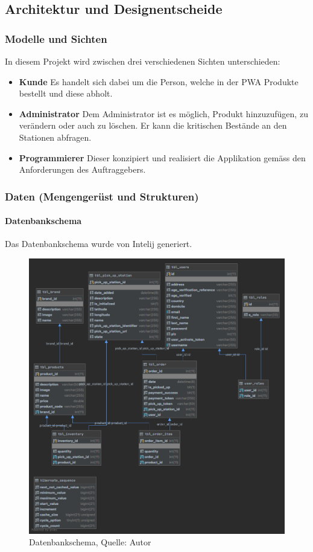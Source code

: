 \subsection{Architektur und Designentscheide}
\subsubsection{Modelle und Sichten}
In diesem Projekt wird zwischen drei verschiedenen Sichten unterschieden:
\begin{itemize}
    \item \textbf{Kunde} Es handelt sich dabei um die Person, welche in der \ac{PWA} Produkte bestellt und diese abholt. 
    \item \textbf{Administrator} Dem Administrator ist es möglich, Produkt hinzuzufügen, zu verändern oder auch zu löschen. Er kann die kritischen Bestände an den Stationen abfragen. 
    \item \textbf{Programmierer} Dieser konzipiert und realisiert die Applikation gemäss den Anforderungen des Auftraggebers.
\end{itemize}
\newpage
\subsubsection{Daten (Mengengerüst und Strukturen)}
\paragraph{Datenbankschema}
Das Datenbankschema wurde von Intelij generiert. 
\begin{figure}[H]
    \centering
    \includegraphics[width=1\textwidth]{images/databaseSchema.png}
    \caption[Datenbankschema]{Datenbankschema, Quelle: Autor}
    \label{img: datebankschema}
\end{figure}
